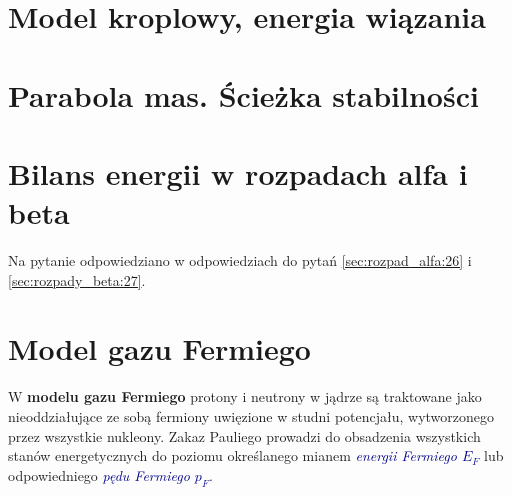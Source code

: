 \documentclass{article}
\let\oldemph\emph
\renewcommand{\emph}[1]{\textcolor{darkblue}{\oldemph{#1}}}
\begin{document}
\newpage
\section{Model kroplowy, energia wiązania}



\newpage
\section{Parabola mas. Ścieżka stabilności}



\newpage
\section{Bilans energii w rozpadach alfa i beta}
\label{sec:bilans_energii_rozpadów:22}
Na pytanie odpowiedziano w odpowiedziach do pytań \ref{sec:rozpad_alfa:26} i \ref{sec:rozpady_beta:27}. 





\section{Model gazu Fermiego}
\label{sec:model_gazu_Fermiego:23}
W \textbf{\color{darknavy}modelu gazu Fermiego} protony i neutrony w jądrze są traktowane jako nieoddziałujące ze sobą fermiony uwięzione w studni potencjału, wytworzonego przez wszystkie nukleony. Zakaz Pauliego prowadzi do obsadzenia wszystkich stanów energetycznych do poziomu określanego mianem \emph{energii Fermiego $E_F$} lub odpowiedniego \emph{pędu Fermiego $p_F$}. 
\end{document}
